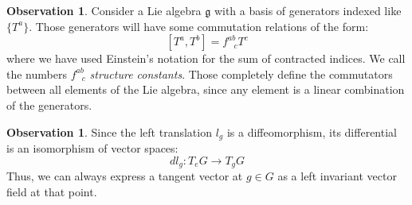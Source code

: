 \documentclass[12pt,a4paper]{report}
\theoremstyle{definition}
\theoremstyle{Theorem}
\theoremstyle{definition}
\theoremstyle{definition}
\newtheorem{Obs}[Def]{Observation}
\begin{document}
	\begin{Obs}
		Consider a Lie algebra $\mathfrak{g}$ with a basis of generators indexed like $\{T^a\}$. Those generators will have some commutation relations of the form:
		$$[T^a,T^b]=f^{ab}_{\hspace{9pt}c}T^c$$
		where we have used Einstein's notation for the sum of contracted indices. We call the numbers $f^{ab}_{\hspace{9pt}c}$ \textit{structure constants}. Those completely define the commutators between all elements of the Lie algebra, since any element is a linear combination of the generators.
	\end{Obs}
	\begin{Obs}
		Since the left translation $l_g$ is a diffeomorphism, its differential is an isomorphism of vector spaces:
		$$dl_g:T_eG\rightarrow T_gG$$
		Thus, we can always express a tangent vector at $g\in G$ as a left invariant vector field at that point.
	\end{Obs}
\end{document}
